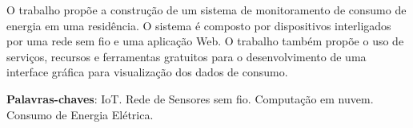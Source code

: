 \setlength{\absparsep}{18pt} %
\begin{resumo}
 O trabalho propõe a construção de um sistema de monitoramento de consumo de energia em uma residência. O sistema é composto por dispositivos interligados por uma rede sem fio e uma aplicação Web. O trabalho também propõe o uso de serviços, recursos e ferramentas gratuitos para o desenvolvimento de uma interface gráfica para visualização dos dados de consumo.

 \textbf{Palavras-chaves}: IoT. Rede de Sensores sem fio. Computação em nuvem. Consumo de Energia Elétrica.
\end{resumo}
